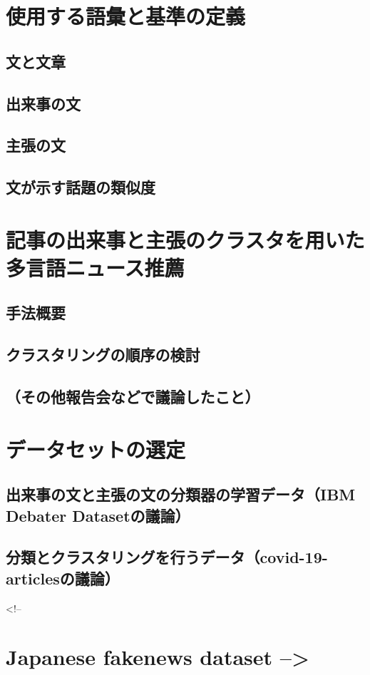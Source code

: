 \documentclass[12pt,a4j]{jreport}
\begin{document}
\section{使用する語彙と基準の定義}
    \subsection{文と文章}
    \subsection{出来事の文}
    \subsection{主張の文}
    \subsection{文が示す話題の類似度}
\section{記事の出来事と主張のクラスタを用いた多言語ニュース推薦}
\subsection{手法概要}
\subsection{クラスタリングの順序の検討}
\subsection{（その他報告会などで議論したこと）}
\section{データセットの選定}
    \subsection{出来事の文と主張の文の分類器の学習データ（IBM Debater Datasetの議論）}
    \subsection{分類とクラスタリングを行うデータ（covid-19-articlesの議論）}
        <!-- \section{Japanese fakenews dataset -->}
\end{document}
